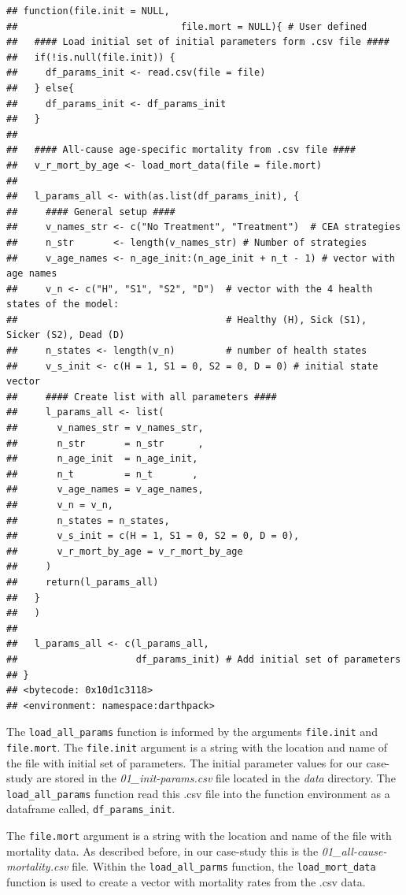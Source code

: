\documentclass[]{book}
\begin{document}
\begin{verbatim}
## function(file.init = NULL,
##                             file.mort = NULL){ # User defined
##   #### Load initial set of initial parameters form .csv file ####
##   if(!is.null(file.init)) {
##     df_params_init <- read.csv(file = file)
##   } else{
##     df_params_init <- df_params_init
##   }
##   
##   #### All-cause age-specific mortality from .csv file ####
##   v_r_mort_by_age <- load_mort_data(file = file.mort)
##   
##   l_params_all <- with(as.list(df_params_init), {
##     #### General setup ####
##     v_names_str <- c("No Treatment", "Treatment")  # CEA strategies
##     n_str       <- length(v_names_str) # Number of strategies
##     v_age_names <- n_age_init:(n_age_init + n_t - 1) # vector with age names
##     v_n <- c("H", "S1", "S2", "D")  # vector with the 4 health states of the model:
##                                     # Healthy (H), Sick (S1), Sicker (S2), Dead (D)
##     n_states <- length(v_n)         # number of health states 
##     v_s_init <- c(H = 1, S1 = 0, S2 = 0, D = 0) # initial state vector
##     #### Create list with all parameters ####
##     l_params_all <- list(
##       v_names_str = v_names_str,
##       n_str       = n_str      ,
##       n_age_init  = n_age_init, 
##       n_t         = n_t       , 
##       v_age_names = v_age_names,
##       v_n = v_n,
##       n_states = n_states,
##       v_s_init = c(H = 1, S1 = 0, S2 = 0, D = 0),
##       v_r_mort_by_age = v_r_mort_by_age
##     )
##     return(l_params_all)
##   }
##   )
##   
##   l_params_all <- c(l_params_all, 
##                     df_params_init) # Add initial set of parameters
## }
## <bytecode: 0x10d1c3118>
## <environment: namespace:darthpack>
\end{verbatim}

The \texttt{load\_all\_params} function is informed by the arguments
\texttt{file.init} and \texttt{file.mort}. The \texttt{file.init}
argument is a string with the location and name of the file with initial
set of parameters. The initial parameter values for our case-study are
stored in the \emph{01\_init-params.csv} file located in the \emph{data}
directory. The \texttt{load\_all\_params} function read this .csv file
into the function environment as a dataframe called,
\texttt{df\_params\_init}.

The \texttt{file.mort} argument is a string with the location and name
of the file with mortality data. As described before, in our case-study
this is the \emph{01\_all-cause-mortality.csv} file. Within the
\texttt{load\_all\_parms} function, the \texttt{load\_mort\_data}
function is used to create a vector with mortality rates from the .csv
data.
\end{document}
